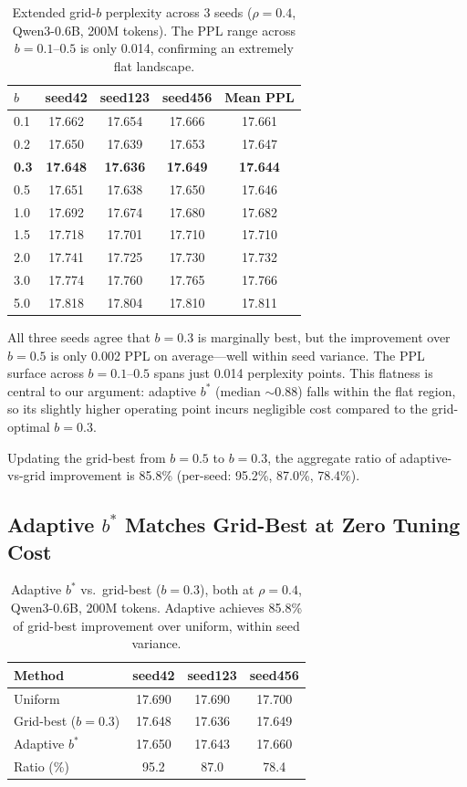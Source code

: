 \documentclass[11pt,a4paper]{article}
\newcommand{\bstar}{b^{*}}
\begin{document}
\begin{table}[t]
\centering
\small
\caption{Extended grid-$b$ perplexity across 3 seeds ($\rho{=}0.4$, Qwen3-0.6B, 200M tokens). The PPL range across $b = 0.1$--$0.5$ is only 0.014, confirming an extremely flat landscape.}
\label{tab:extended_grid}
\begin{tabular}{lcccc}
\toprule
$b$ & seed42 & seed123 & seed456 & Mean PPL \\
\midrule
0.1 & 17.662 & 17.654 & 17.666 & 17.661 \\
0.2 & 17.650 & 17.639 & 17.653 & 17.647 \\
\textbf{0.3} & \textbf{17.648} & \textbf{17.636} & \textbf{17.649} & \textbf{17.644} \\
0.5 & 17.651 & 17.638 & 17.650 & 17.646 \\
1.0 & 17.692 & 17.674 & 17.680 & 17.682 \\
1.5 & 17.718 & 17.701 & 17.710 & 17.710 \\
2.0 & 17.741 & 17.725 & 17.730 & 17.732 \\
3.0 & 17.774 & 17.760 & 17.765 & 17.766 \\
5.0 & 17.818 & 17.804 & 17.810 & 17.811 \\
\bottomrule
\end{tabular}
\end{table}

All three seeds agree that $b{=}0.3$ is marginally best, but the improvement over $b{=}0.5$ is only 0.002 PPL on average---well within seed variance.
The PPL surface across $b = 0.1$--$0.5$ spans just 0.014 perplexity points.
This flatness is central to our argument: adaptive $\bstar$ (median $\sim$0.88) falls within the flat region, so its slightly higher operating point incurs negligible cost compared to the grid-optimal $b{=}0.3$.

Updating the grid-best from $b{=}0.5$ to $b{=}0.3$, the aggregate ratio of adaptive-vs-grid improvement is 85.8\% (per-seed: 95.2\%, 87.0\%, 78.4\%).

\subsection{Adaptive $\bstar$ Matches Grid-Best at Zero Tuning Cost}
\label{sec:adaptive_vs_grid}

\begin{table}[t]
\centering
\small
\caption{Adaptive $\bstar$ vs.\ grid-best ($b{=}0.3$), both at $\rho{=}0.4$, Qwen3-0.6B, 200M tokens. Adaptive achieves 85.8\% of grid-best improvement over uniform, within seed variance.}
\label{tab:adaptive_vs_grid}
\begin{tabular}{lccc}
\toprule
Method & seed42 & seed123 & seed456 \\
\midrule
Uniform & 17.690 & 17.690 & 17.700 \\
Grid-best ($b{=}0.3$) & 17.648 & 17.636 & 17.649 \\
Adaptive $\bstar$ & 17.650 & 17.643 & 17.660 \\
\midrule
Ratio (\%) & 95.2 & 87.0 & 78.4 \\
\bottomrule
\end{tabular}
\end{table}
\end{document}
